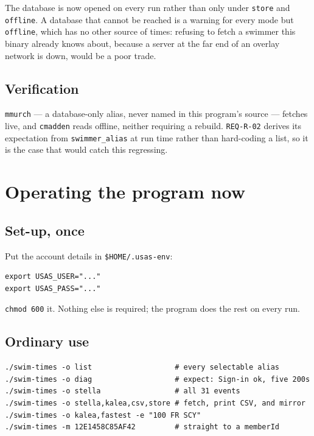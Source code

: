 \documentclass[11pt]{article}
\newcommand{\code}[1]{\texttt{#1}}
\newcommand{\req}[1]{\texttt{#1}}
\begin{document}
The database is now opened on every run rather than only under
\code{store} and \code{offline}.  A database that cannot be reached is a
warning for every mode but \code{offline}, which has no other source of
times: refusing to fetch a swimmer this binary already knows about,
because a server at the far end of an overlay network is down, would be
a poor trade.

\subsection{Verification}

\code{mmurch} --- a database-only alias, never named in this program's
source --- fetches live, and \code{cmadden} reads offline, neither
requiring a rebuild.  \req{REQ-R-02} derives its expectation from
\code{swimmer\_alias} at run time rather than hard-coding a list, so it
is the case that would catch this regressing.

\section{Operating the program now}

\subsection{Set-up, once}

Put the account details in \code{\$HOME/.usas-env}:

\begin{lstlisting}
export USAS_USER="..."
export USAS_PASS="..."
\end{lstlisting}

\noindent \code{chmod 600} it.  Nothing else is required; the program
does the rest on every run.

\subsection{Ordinary use}

\begin{lstlisting}
./swim-times -o list                   # every selectable alias
./swim-times -o diag                   # expect: Sign-in ok, five 200s
./swim-times -o stella                 # all 31 events
./swim-times -o stella,kalea,csv,store # fetch, print CSV, and mirror
./swim-times -o kalea,fastest -e "100 FR SCY"
./swim-times -m 12E1458C85AF42         # straight to a memberId
\end{lstlisting}
\end{document}
